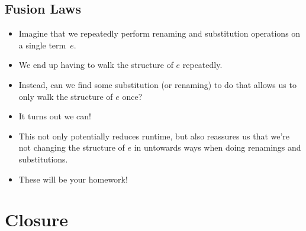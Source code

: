 \documentclass{lecturenotes}
\begin{document}
\subsection{Fusion Laws}
\label{sec:fusion-laws}

\begin{itemize}
\item Imagine that we repeatedly perform renaming and substitution operations on a single term~$e$.
\item We end up having to walk the structure of $e$ repeatedly.
\item Instead, can we find some substitution (or renaming) to do that allows us to only walk the structure of $e$ once?
\item It turns out we can!
\item This not only potentially reduces runtime, but also reassures us that we're not changing the structure of $e$ in untowards ways when doing renamings and substitutions.
\item These will be your homework!
\end{itemize}

\section{Closure}
\label{sec:closure}
\end{document}

